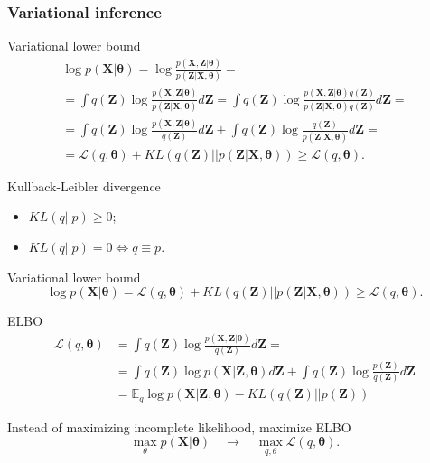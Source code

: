 \documentclass{beamer}
\newcommand{\bX}{\mathbf{X}}
\newcommand{\bZ}{\mathbf{Z}}
\newcommand{\btheta}{\boldsymbol{\theta}}
\begin{document}
\subsubsection{Variational inference}
\begin{frame}{Variational lower bound}
	\begin{multline*}
		\log p(\bX| \btheta) 
		= \log \frac{p(\bX, \bZ| \btheta)}{p(\bZ|\bX, \btheta)} = \\ 
		= \int q(\bZ) \log \frac{p(\bX, \bZ| \btheta)}{p(\bZ|\bX, \btheta)}d\bZ
		= \int q(\bZ) \log \frac{p(\bX, \bZ| \btheta) q(\bZ)}{p(\bZ|\bX, \btheta) q(\bZ)} d\bZ = \\
		= \int q(\bZ) \log \frac{p(\bX, \bZ | \btheta)}{q(\bZ)}d\bZ + \int q(\bZ) \log \frac{q(\bZ)}{p(\bZ|\bX, \btheta)}d\bZ = \\ 
		= \mathcal{L} (q, \btheta) + KL(q(\bZ) || p(\bZ|\bX, \btheta)) \geq \mathcal{L} (q, \btheta).
	\end{multline*}
	\begin{block}{Kullback-Leibler divergence}
	    \begin{itemize}
	        \item $KL(q || p) \geq 0$;
	        \item $KL(q || p) = 0 \Leftrightarrow q \equiv p$.
	    \end{itemize}
	\end{block}
\end{frame}
\begin{frame}{Variational lower bound}
\[
    \log p(\bX| \btheta) = \mathcal{L} (q, \btheta) + KL(q(\bZ) || p(\bZ|\bX, \btheta)) \geq \mathcal{L} (q, \btheta).
\]
\begin{block}{ELBO}
\begin{align*}
    \mathcal{L} (q, \btheta) &= \int q(\bZ) \log \frac{p(\bX, \bZ | \btheta)}{q(\bZ)}d\bZ = \\ 
    &= \int q(\bZ) \log p(\bX | \bZ, \btheta) d\bZ + \int q(\bZ) \log \frac{p(\bZ)}{q(\bZ)}d\bZ \\ 
    &= \mathbb{E}_{q} \log p(\bX | \bZ, \btheta) - KL (q(\bZ) || p(\bZ))
\end{align*}
\end{block}
Instead of maximizing incomplete likelihood, maximize ELBO
\[
    \max_{\theta} p(\bX | \btheta) \quad \rightarrow \quad \max_{q, \theta} \mathcal{L} (q, \btheta).
\]
    
\end{frame}
\end{document}
